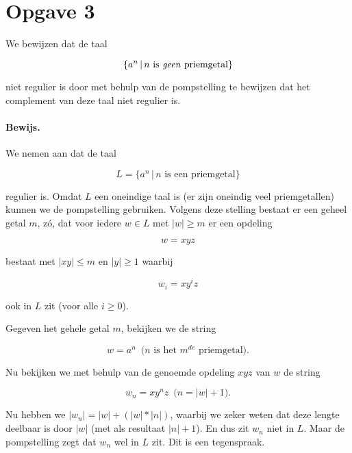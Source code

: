 \documentclass[a4paper,11pt]{article}
\begin{document}
\section*{Opgave 3}


We bewijzen dat de taal

\begin{displaymath}
\{a^{n} \, | \, n \mbox{ is \emph{geen} priemgetal}\}
\end{displaymath}

niet regulier is door met behulp van de pompstelling te bewijzen dat het
complement van deze taal niet regulier is.

\paragraph{Bewijs.}

We nemen aan dat de taal

\begin{displaymath}
L = \{a^{n} \, | \, n \mbox{ is een priemgetal}\}
\end{displaymath}

regulier is. Omdat $L$ een oneindige taal is (er zijn oneindig veel
priemgetallen) kunnen we de pompstelling gebruiken. Volgens deze stelling
bestaat er een geheel getal $m$, z\'o, dat voor iedere $w \in L$ met
$|w| \geq m$ er een opdeling

\begin{displaymath}
w = xyz
\end{displaymath}

bestaat met $|xy| \leq m$ en $|y| \geq 1$ waarbij

\begin{displaymath}
w_{i} = xy^{i}z
\end{displaymath}

ook in $L$ zit (voor alle $i \geq 0$).

Gegeven het gehele getal $m$, bekijken we de string

\begin{displaymath}
w = a^{n} \, \mbox{ ($n$ is het $m^{de}$ priemgetal).}
\end{displaymath}

Nu bekijken we met behulp van de genoemde opdeling $xyz$ van $w$ de string

\begin{displaymath}
w_{n} = xy^{n}z \, \mbox{ ($n = |w|+1$).}
\end{displaymath}

Nu hebben we $|w_{n}| = |w|+(|w|*|n|)$, waarbij we zeker weten dat deze
lengte deelbaar is door $|w|$ (met als resultaat $|n|+1$). En dus zit $w_{n}$
niet in $L$. Maar de pompstelling zegt dat $w_{n}$ wel in $L$ zit. Dit is
een tegenspraak.
\end{document}
